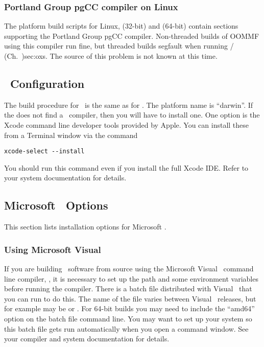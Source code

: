 \subsubsection{Portland Group pgCC compiler on Linux}
The platform build scripts for Linux,
 (32-bit) and
 (64-bit) contain sections
supporting the Portland Group pgCC compiler.  Non-threaded builds of
OOMMF using this compiler run fine, but threaded builds segfault when
running  {/
 (Ch.~}{)}{sec:oxs}.  The source of this problem is not known at this
time.


\subsection{\MacOSX\ Configuration}\label{sec:install.macosx}
The build procedure for \MacOSX\ is the same as for \Unix.  The
platform name is ``darwin''.  If the  does not find a \Cplusplus\ compiler,
then you will have to install one.  One option is the Xcode command line
developer tools provided by Apple.  You can install these from a
Terminal window via the command
\begin{verbatim}
xcode-select --install
\end{verbatim}
You should run this command even if you install the full Xcode IDE.
Refer to your system documentation for details.

\subsection{Microsoft \Windows\ Options}\label{sec:install.windows}

This section lists installation options for Microsoft \Windows.

\subsubsection{Using Microsoft Visual \Cplusplus}
If you are building \OOMMF\ software from source using the Microsoft
Visual \Cplusplus\ command line compiler, , it is necessary to set up
the path and some environment variables before running the compiler.
There is a batch file distributed with Visual \Cplusplus\ that you can run to do
this.  The name of the file varies between Visual \Cplusplus\ releases, but for
example may be  or .  For 64-bit builds
you may need to include the ``amd64'' option on the batch file command
line.  You may want to set up your system so this batch file gets run
automatically when you open a command window.  See your compiler and
system documentation for details.

